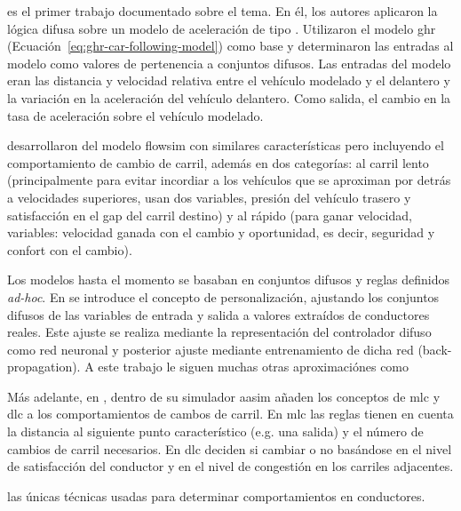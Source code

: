 \cite{Kikuchi1992} es el primer trabajo documentado sobre el tema. En él, los autores aplicaron la lógica difusa sobre un modelo de aceleración de tipo \textit{}. Utilizaron el modelo \gls{ghr} (Ecuación~\ref{eq:ghr-car-following-model}) como base y determinaron las entradas al modelo como valores de pertenencia a conjuntos difusos. Las entradas del modelo eran las distancia y velocidad relativa entre el vehículo modelado y el delantero y la variación en la aceleración del vehículo delantero. Como salida, el cambio en la tasa de aceleración sobre el vehículo modelado.

\cite{McDonald1997, Wu2003} desarrollaron del modelo \gls{flowsim} con similares características pero incluyendo el comportamiento de cambio de carril, además en dos categorías: al carril lento (principalmente para evitar incordiar a los vehículos que se aproximan por detrás a velocidades superiores, usan dos variables, presión del vehículo trasero y satisfacción en el gap del carril destino) y al rápido (para ganar velocidad, variables: velocidad ganada con el cambio y oportunidad, es decir, seguridad y confort con el cambio).

Los modelos hasta el momento se basaban en conjuntos difusos y reglas definidos \textit{ad-hoc}. En \cite{Chakroborty2003} se introduce el concepto de personalización, ajustando los conjuntos difusos de las variables de entrada y salida a valores extraídos de conductores reales. Este ajuste se realiza mediante la representación del controlador difuso como red neuronal y posterior ajuste mediante entrenamiento de dicha red (back-propagation). A este trabajo le siguen muchas otras aproximaciónes  como \cite{Ma2004, Zheng2005}

Más adelante, en \cite{Das2009}, dentro de su simulador \gls{aasim} añaden los conceptos de \gls{mlc} y \gls{dlc} a los comportamientos de cambos de carril. En \gls{mlc} las reglas tienen en cuenta la distancia al siguiente punto característico (e.g. una salida) y el número de cambios de carril necesarios. En \gls{dlc} deciden si cambiar o no basándose en el nivel de satisfacción del conductor y en el nivel de congestión en los carriles adjacentes.

 las únicas técnicas usadas para determinar comportamientos en conductores.

